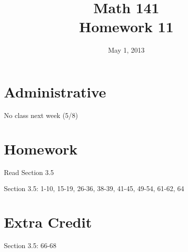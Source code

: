 \documentclass{exam}
\date{May 1, 2013}
\author{}
\title{Math 141 \\ Homework 11}
\begin{document}
  \maketitle

  \section{Administrative}
  No class next week (5/8)

  \section{Homework}

  \begin{itemize*}
    \item Read Section 3.5 
    \item Section 3.5: 1-10, 15-19, 26-36, 38-39, 41-45, 49-54, 61-62, 64
  \end{itemize*}

  \section{Extra Credit}
  Section 3.5: 66-68

  \ifprintanswers
    \pagebreak
\end{document}
